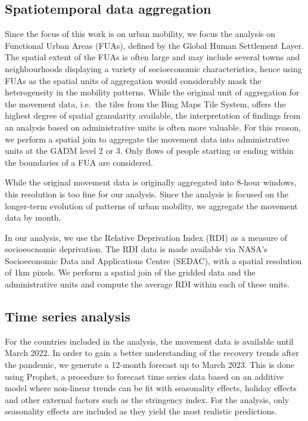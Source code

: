 \documentclass[
  11pt,
]{article}
\begin{document}
\hypertarget{spatiotemporal-data-aggregation}{%
\subsection{Spatiotemporal data
aggregation}\label{spatiotemporal-data-aggregation}}

Since the focus of this work is on urban mobility, we focus the analysis
on Functional Urban Areas (FUAs), defined by the Global Human Settlement
Layer. The spatial extent of the FUAs is often large and may include
several towns and neighbourhoods displaying a variety of socioeconomic
characteristics, hence using FUAs as the spatial units of aggregation
would considerably mask the heterogeneity in the mobility patterns.
While the original unit of aggregation for the movement data, i.e.~the
tiles from the Bing Maps Tile System, offers the highest degree of
spatial granularity available, the interpretation of findings from an
analysis based on administrative units is often more valuable. For this
reason, we perform a spatial join to aggregate the movement data into
administrative units at the GADM level 2 or 3. Only flows of people
starting or ending within the boundaries of a FUA are considered.

While the original movement data is originally aggregated into 8-hour
windows, this resolution is too fine for our analysis. Since the
analysis is focused on the longer-term evolution of patterns of urban
mobility, we aggregate the movement data by month.

In our analysis, we use the Relative Deprivation Index (RDI) as a
measure of socioeocnomic deprivation. The RDI data is made available via
NASA's Socioeconomic Data and Applications Centre (SEDAC), with a
spatial resolution of 1km pixels. We perform a spatial join of the
gridded data and the administrative units and compute the average RDI
within each of these units.

\hypertarget{time-series-analysis}{%
\subsection{Time series analysis}\label{time-series-analysis}}

For the countries included in the analysis, the movement data is
available until March 2022. In order to gain a better understanding of
the recovery trends after the pandemic, we generate a 12-month forecast
up to March 2023. This is done using Prophet, a procedure to forecast
time series data based on an additive model where non-linear trends can
be fit with seasonality effects, holiday effects and other external
factors such as the stringency index. For the analysis, only seasonality
effects are included as they yield the most realistic predictions.
\end{document}
